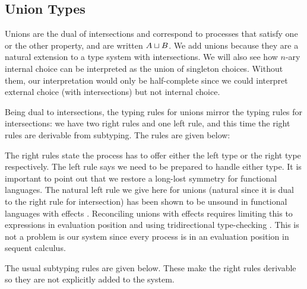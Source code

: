 \documentclass[a4paper,USenglish]{lipics-v2016}
\begin{document}
\subsection{Union Types}

Unions are the dual of intersections and correspond to processes that satisfy one or the other property, and are written $A \mathbin{\sqcup} B$. We add unions because they are a natural extension to a  type system with intersections. We will also see how $n$-ary internal choice can be interpreted as
the union of singleton choices. Without them, our interpretation would only be half-complete since we could interpret external choice (with intersections) but not internal choice.

Being dual to intersections, the typing rules for unions mirror the typing rules for intersections: we have two right rules and one left rule, and this time the right rules are derivable from subtyping. The rules are given below:


The right rules state the process has to offer either the left type or the right type respectively. The left rule says we need to be prepared to handle either type. It is important to point out that we restore a long-lost symmetry for functional languages. The natural left rule we give here for unions (natural since it is dual to the right rule for intersection) has been shown to be unsound in functional languages with effects . Reconciling unions with effects requires limiting this to expressions in evaluation position and using tridirectional type-checking \cite{DunfieldP04}. This is not a problem is our system since every process is in an evaluation position in sequent calculus.

The usual subtyping rules are given below. These make the right rules derivable so they are not explicitly added to the system.

\end{document}
